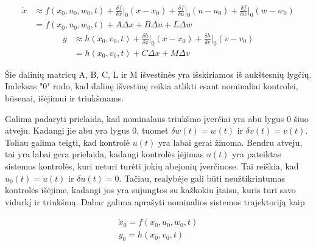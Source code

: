 \documentclass[12pt, a4paper, lithuanian]{article}
\begin{document}
        \begin{equation}
            \begin{aligned}
                \dot{x} &\approx f(x_0, u_0, w_0, t) + \frac{\delta f}{\delta x}\Bigr|_{0} (x-x_0) + \frac{\delta f}{\delta u}\Bigr|_{0} (u-u_0) + \frac{\delta f}{\delta w}\Bigr|_{0} (w-w_0) \\
                &= f(x_0, u_0, w_0, t) + A\Delta x + B \Delta u + L \Delta w
            \end{aligned}
        \end{equation}
        \begin{equation}
            \begin{aligned}
                y &\approx h(x_0, v_0, t) + \frac{\delta h}{\delta x}\Bigr|_{0}(x-x_0) + \frac{\delta h}{\delta v}\Bigr|_{0}(v-v_0) \\
                &= h(x_0, v_0, t) + C \Delta x + M \Delta v
            \end{aligned}
        \end{equation}

        Šie dalinių matricų A, B, C, L ir M išvestinės yra išskiriamos iš aukštesnių lygčių.
        Indeksas "0" rodo, kad dalinę išvestinę reikia atlikti esant nominaliai kontrolei, būsenai, išėjimui ir triukšmams.

        Galima padaryti prielaida, kad nominalaus triukšmo įverčiai yra abu lygus 0 šiuo atveju.
        Kadangi jie abu yra lygus 0, tuomet $\delta w(t) = w(t)$ ir $\delta v(t) = v(t)$.
        Toliau galima teigti, kad kontrolė $u(t)$ yra labai gerai žinoma.
        Bendru atveju, tai yra labai gera prielaida, kadangi kontrolės įėjimas $u(t)$ yra pateiktas sistemos kontrolės, kuri neturi turėti jokių abejonių įverčiuose.
        Tai reiškia, kad $u_0(t) = u(t)$ ir $\delta u(t) = 0$.
        Tačiau, realybėje gali būti neužtikrintumas kontrolės išėjime, kadangi jos yra sujungtos su kažkokiu įtaisu, kuris turi savo vidurkį ir triukšmą.
        Dabar galima aprašyti nominalios sistemos trajektoriją kaip

        \begin{equation}
            \label{eq:nominal_sistem_trajektory}
            \begin{aligned}
                \dot{x}_0 = f(x_0, u_0, w_0, t) \\
                y_0 = h(x_0, v_0, t)
            \end{aligned}
        \end{equation}
\end{document}

